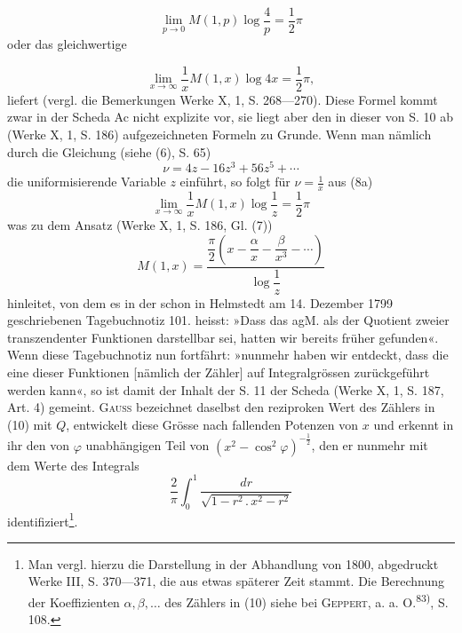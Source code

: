 \begin{equation*}
\lim\limits_{p\to0}M(1,p)\log\frac4p=\frac12\pi\tag*{(8)}
\end{equation*}
\endgroup
\noindent oder das gleichwertige\par
\clearpage{}
\begingroup\makeatletter\tagsleft@true\let\veqno\leqno\makeatother
\begin{equation*}
\lim\limits_{x\to\infty}\frac1xM(1,x)\log4x=\frac12\pi,\tag*{(8a)}
\end{equation*}
\noindent liefert (vergl. die Bemerkungen Werke X, 1, S. 268—270). Diese Formel
kommt zwar in der Scheda Ac nicht explizite vor, sie liegt aber den in dieser
von S. 10 ab (Werke X, 1, S. 186) aufgezeichneten Formeln zu Grunde. Wenn
man nämlich durch die Gleichung (siehe (6), S. 65)
\[
\nu=4z-16z^3+56z^5+\cdots
\]
\noindent die uniformisierende Variable \(z\) einführt, so folgt für \(\nu=\frac1x\) aus (8a)
\begin{equation*}
\lim\limits_{x\to\infty}\frac1xM(1,x)\log\frac1z=\frac12\pi\tag*{(9)}
\end{equation*}
\noindent was zu dem Ansatz (Werke X, 1, S. 186, Gl. (7))
\begin{equation*}
M(1,x)=\frac{\dfrac\pi2\left(x-\dfrac\alpha x-\dfrac\beta{x^3}-\cdots\right)}{\log\dfrac1z}\tag*{(10)}
\end{equation*}
\noindent hinleitet, von dem es in der schon in Helmstedt am 14. Dezember 1799 geschriebenen
Tagebuchnotiz 101. heisst: »Dass das agM. als der Quotient zweier
transzendenter Funktionen darstellbar sei, hatten wir bereits früher gefunden«.
Wenn diese Tagebuchnotiz nun fortfährt: »nunmehr haben wir entdeckt, dass
die eine dieser Funktionen [nämlich der Zähler] auf Integralgrössen zurückgeführt
werden kann«, so ist damit der Inhalt der S. 11 der Scheda (Werke
X, 1, S. 187, Art. 4) gemeint. \textsc{Gauss} bezeichnet daselbst den reziproken Wert
des Zählers in (10) mit \(Q\), entwickelt diese Grösse nach fallenden Potenzen
von \(x\) und erkennt in ihr den von \(\varphi\) unabhängigen Teil von \((x^2-\cos^2\varphi)^{-\frac12}\),
den er nunmehr mit dem Werte des Integrals
\begin{equation*}
\frac2\pi\int_0^1\frac{dr}{\sqrt{1-r^2\,.\,x^2-r^2}}\tag*{(11)}
\end{equation*}
\endgroup
\noindent identifiziert\footnote{Man vergl. hierzu die Darstellung in der Abhandlung von 1800, abgedruckt Werke III, S. 370—371, die aus etwas späterer Zeit stammt. Die Berechnung der Koeffizienten \(\alpha,\beta,\ldots\) des Zählers in (10) siehe bei \textsc{Geppert}, a. a. O.\textsuperscript{83)}, S. 108.}.

